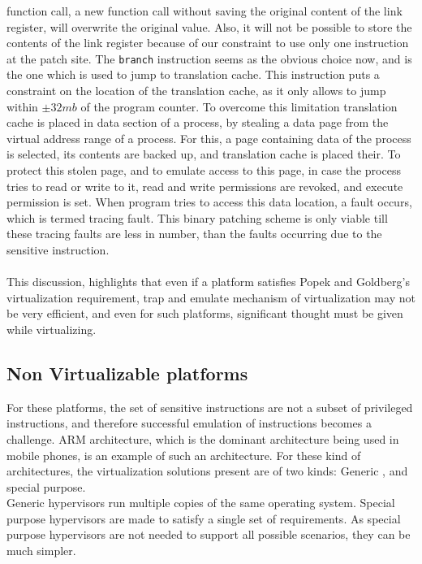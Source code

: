 \documentclass[a4paper,10pt]{article}
\begin{document}
  function call, a new function call without saving the original content of the link register, will overwrite the original value. Also, it
  will not be possible to store the contents of the link register because of our constraint to use only one instruction at the patch site.
  The \texttt{branch} instruction seems as the obvious choice now, and is the one which is used to jump to translation cache. This instruction puts a constraint on the location
  of the translation cache, as it only allows to jump within $\pm 32mb$ of the program counter.
  To overcome this limitation translation cache is placed in data section of a process, by stealing a data page from the virtual address range of a process. For this, a page containing data of the process is selected,
  its contents are backed up, and translation cache is placed their. To protect this stolen page, and to emulate access to this page, in case the process tries to read or write to
  it, read and write permissions are revoked, and execute permission is set.
  When program tries to access this data location, a fault occurs, which is termed tracing fault. This binary patching scheme is only viable till these tracing
  faults are less in number, than the faults occurring due to the sensitive instruction.
  \\\\
  This discussion, highlights that even if a platform satisfies Popek and Goldberg's virtualization requirement, trap and emulate mechanism of virtualization
  may not be very efficient, and even for such platforms, significant thought must be given while virtualizing.
  
  \subsection{Non Virtualizable platforms}
  For these platforms, the set of sensitive instructions are not a subset of privileged instructions, and therefore successful emulation of instructions
  becomes a challenge. ARM architecture, which is the dominant architecture being used in mobile phones, is an example of such an architecture.
  For these kind of architectures, the virtualization solutions present are of two kinds: Generic , and special purpose.
  \\
  Generic hypervisors run multiple copies of the same operating system. Special purpose hypervisors are made to satisfy a single set of requirements. As special
  purpose hypervisors are not needed to support all possible scenarios, they can be much simpler.
  
\end{document}
